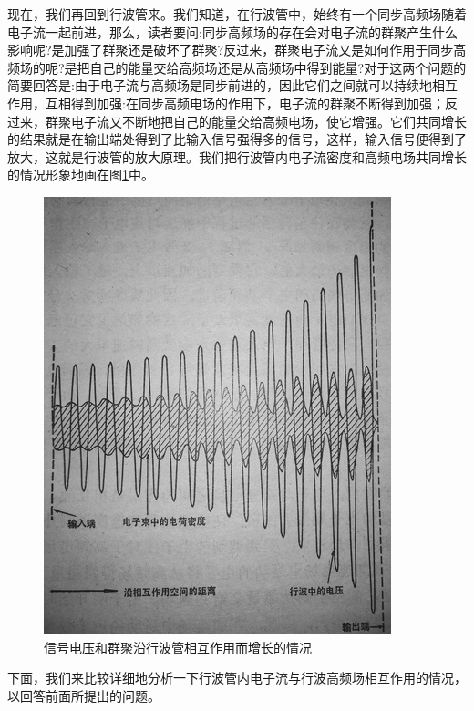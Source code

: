 现在，我们再回到行波管来。我们知道，在行波管中，始终有一个同步高频场随着电子流一起前进，那么，读者要问:同步高频场的存在会对电子流的群聚产生什么影响呢?是加强了群聚还是破坏了群聚?反过来，群聚电子流又是如何作用于同步高频场的呢?是把自己的能量交给高频场还是从高频场中得到能量?对于这两个问题的简要回答是:由于电子流与高频场是同步前进的，因此它们之间就可以持续地相互作用，互相得到加强:在同步高频电场的作用下，电子流的群聚不断得到加强；反过来，群聚电子流又不断地把自己的能量交给高频电场，使它增强。它们共同增长的结果就是在输出端处得到了比输入信号强得多的信号，这样，输入信号便得到了放大，这就是行波管的放大原理。我们把行波管内电子流密度和高频电场共同增长的情况形象地画在图\ref{ch2-4}中。
\begin{figure}[htbp]
	\centering
	\includegraphics[width=0.7\linewidth]{figure/ch2-4}
	\caption{信号电压和群聚沿行波管相互作用而增长的情况}
	\label{ch2-4}
\end{figure}

下面，我们来比较详细地分析一下行波管内电子流与行波高频场相互作用的情况，以回答前面所提出的问题。

